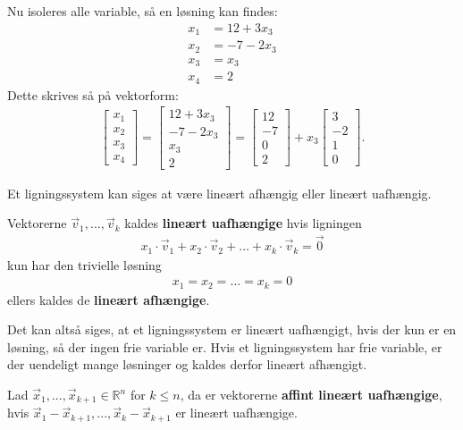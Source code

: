 \begin{eks}
Nu isoleres alle variable, så en løsning kan findes:
\begin{align*}
x_1 &= 12 + 3x_3 \\
x_2 &= -7 - 2x_3 \\
x_3 &= x_3 \\
x_4 &= 2
\end{align*}
Dette skrives så på vektorform:
\begin{align*}
\begin{bmatrix}
x_1 \\
x_2 \\
x_3 \\
x_4 
\end{bmatrix}
= \begin{bmatrix}
12 + 3x_3 \\
-7 - 2x_3 \\
x_3 \\
2
\end{bmatrix}
= \begin{bmatrix}
12 \\
-7 \\
0 \\
2
\end{bmatrix}
+ x_3 \begin{bmatrix}
3 \\
-2 \\
1 \\
0
\end{bmatrix}.
\end{align*}
\end{eks}


Et ligningssystem kan siges at være lineært afhængig eller lineært uafhængig.

\begin{defn}
Vektorerne $\vec{v}_1, \dots ,\vec{v}_k$ kaldes \textbf{lineært uafhængige} hvis ligningen
\begin{align*}
x_1 \cdot \vec{v}_1+x_2 \cdot \vec{v}_2 + \dots + x_k \cdot \vec{v}_k =  \vec{0}
\end{align*}
kun har den trivielle løsning
\begin{align*}
x_1=x_2= \dots =x_k=0
\end{align*}
ellers kaldes de \textbf{lineært afhængige}.
\label{defn_lin_uafh}
\end{defn}
Det kan altså siges, at et ligningssystem er lineært uafhængigt, hvis der kun er en løsning, så der ingen frie variable er. Hvis et ligningssystem har frie variable, er der uendeligt mange løsninger og kaldes derfor lineært afhængigt. 

\begin{defn}
Lad $\vec{x}_1,..., \vec{x}_{k+1} \in \mathds{R}^n$ for $k \leq n$, da er vektorerne \textbf{affint lineært uafhængige}, hvis 
$\vec{x}_1- \vec{
x}_{k+1},...,\vec{x}_k- \vec{x}_{k+1}$ er lineært uafhængige.
\end{defn}



